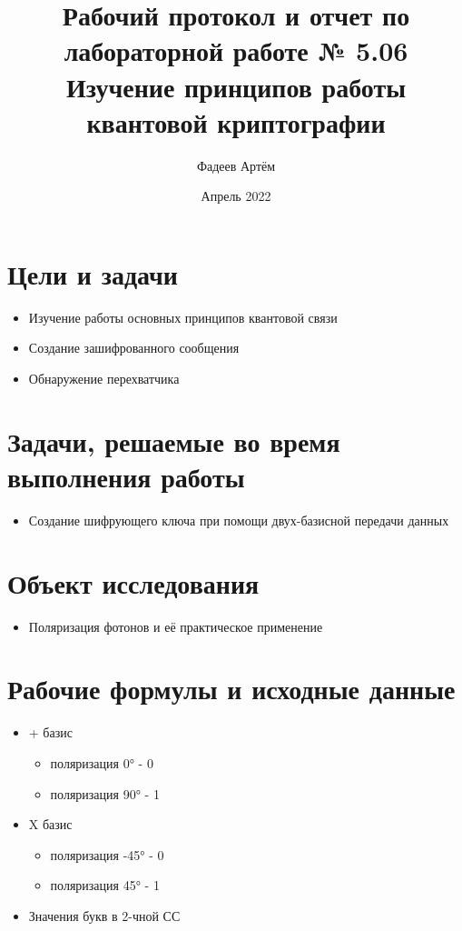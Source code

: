 \documentclass[12pt, a4paper]{article}
\title{Рабочий протокол и отчет по лабораторной работе № 5.06
\\ Изучение принципов работы квантовой криптографии
}
\author{Фадеев Артём }
\date{Апрель 2022}
\begin{document}
\maketitle

\section{Цели и задачи}

\begin{itemize}
    \item Изучение работы основных принципов квантовой связи
    \item Создание зашифрованного сообщения
    \item Обнаружение перехватчика
\end{itemize}

\section{Задачи, решаемые во время выполнения работы}

\begin{itemize}
    \item Создание шифрующего ключа при помощи двух-базисной передачи данных
\end{itemize}

\section{Объект исследования}
\begin{itemize}
    \item Поляризация фотонов и её практическое применение
\end{itemize}
\section{Рабочие формулы и исходные данные}

\begin{itemize}
    \item + базис
    \begin{itemize}
        \item поляризация 0° - 0
        \item поляризация 90° - 1 
    \end{itemize}
    \item X базис
    \begin{itemize}
        \item поляризация -45° - 0
        \item поляризация 45° - 1 
    \end{itemize}
    \item Значения букв в 2-чной СС
\end{itemize}
\end{document}
